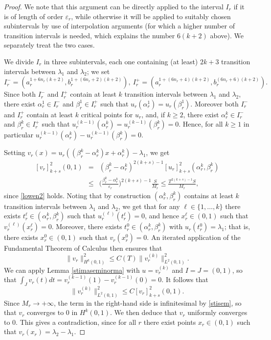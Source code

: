 \documentclass{article}
\newcommand{\e}{\varepsilon}
\begin{document}
\begin{proof}
We note that this argument can be directly applied to the interval $I_r$ if it is of length  
of order $\e_r$, while otherwise it will be applied to suitably chosen subintervals by use of interpolation arguments (for which a higher number of transition intervals is needed, which explains the number $6(k+2)$ above).
We separately treat the two cases.
\medskip \goodbreak

\noindent {\em Case $1$: $\sup_{r}\frac{|I_r|}{\e_r}\leq T<+\infty$.} 

\smallskip
We divide $I_r$ in three subintervals, each one containing (at least) $2k+3$ transition intervals between $\lambda_1$ and $\lambda_2$; we set 
$$I^-_r=(a_r^{1+6n_r(k+2)}, b_r^{1+(6n_r+2)(k+2)}),\ I^+_r=(a_r^{1+(6n_r+4)(k+2)}, b_r^{(6n_r+6)(k+2)}).$$ 
Since both $I^-_r$ and $I^+_r$ contain at least $k$ transition intervals between $\lambda_1$ and $\lambda_2$, 
there exist $\alpha^1_r\in I^-_r$ and $\beta^1_r\in I^+_r$ such that 
$u_r(\alpha^1_r)=u_r(\beta^1_r)$.
Moreover both $I^-_r$ and $I^+_r$ contain at least $k$ critical points for $u_{r}$, and, if $k\ge 2$, there exist $\alpha^k_r\in I^-_r$ and $\beta^k_r\in I^+_r$ such that 
$u_r^{(k-1)}(\alpha^k_r)=u_r^{(k-1)}(\beta^k_r)=0$. Hence, for all $k\ge 1$ in particular $u_r^{(k-1)}(\alpha^k_r)-u_r^{(k-1)}(\beta^k_r)=0$.

Setting $v_r(x)=u_r((\beta^k_r-\alpha^k_r) x+\alpha^k_r)-\lambda_1$, we get 
\begin{eqnarray}\label{stisem}
[v_r]^2_{k+s}(0,1)&=&(\beta^k_r-\alpha^k_r)^{2(k+s)-1}[u_r]^2_{k+s}(\alpha^k_r,\beta^k_r)\nonumber\\ 
&\leq&\Big(\frac{\beta^k_r-\alpha^k_r}{\e_r}\Big)^{2(k+s)-1}\frac{S}{M_r}\leq \frac{{T}^{2(k+s)-1}S}{M_r}, 
\end{eqnarray}
since \eqref{lowen2} holds. 
Noting that by construction $(\alpha^k_r,\beta^k_r)$ contains at least 
$k$ transition intervals between $\lambda_1$ and $\lambda_2$, 
we get that for any $\ell\in\{1,\dots, k\}$ there exists
$t_r^\ell\in (\alpha^k_r,\beta^k_r)$ such that $u_r^{(\ell)}(t_r^\ell)=0$, and hence $x_r^\ell\in (0,1)$ such that $v_r^{(\ell)}(x_r^\ell)=0$. Moreover, 
there exists 
$t_r^0\in (\alpha^k_r,\beta^k_r)$ with $u_r(t_r^0)=\lambda_1$; that is, there exists $x_r^0\in (0,1)$ such that $v_r(x_r^0)=0$. 
An iterated application of the Fundamental Theorem of Calculus then ensures that 
$$\|v_r\|^2_{H^k(0,1)}\leq C(T) \|v_r^{(k)}\|_{L^2(0,1)}^2.$$
We can apply Lemma \ref{stimaseminorma} with $u=v_r^{(k)}$ and $I=J=(0,1)$, so that $\int_J v_r(t)dt =v_r^{(k-1)}(1)-v_r^{(k-1)}(0)=0$. It follows that 
$$\|v_r^{(k)}\|_{L^2(0,1)}^2\leq C [v_r]^2_{k+s}(0,1).$$ 
Since $M_r\to+\infty$, the term in the right-hand side is infinitesimal by \eqref{stisem}, 
so that $v_r$ converges to $0$ in ${H^k(0,1)}$. We then deduce that $v_r$ uniformly converges to $0$. This gives a contradiction, since for all $r$ there exist points $x_r\in(0,1)$ such that $v_r(x_r)=\lambda_2-\lambda_1$. 
\medskip \goodbreak


\end{proof}
\end{document}
